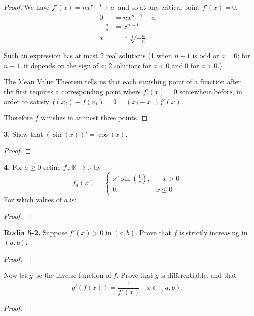 \documentclass{article}
\newcommand{\R}{\mathbb{R}}
\newcommand{\paren}[1]{\left( #1 \right)}
\newcommand{\problem}[1]{\noindent \textbf{#1}}
\begin{document}
\begin{proof}
    We have $f'(x) = nx^{n - 1} + a$, and so at any critical point $f'(x) = 0$, 
    \begin{align*}
        0 &= nx^{n - 1} + a \\
        -\frac{a}{n} &= x^{n - 1} \\
        x &= \sqrt[n - 1]{-\frac{a}{n}}
    \end{align*}

    Such an expression has at most $2$ real solutions (1 when $n - 1$ is odd or $a = 0$; for $n - 1$, it depends on the sign of $a$; 2 solutions for $a < 0$ and $0$ for $a > 0$.)

    The Mean Value Theorem tells us that each vanishing point of a function after the first requires a corresponding point where $f'(x) = 0$ somewhere before, in order to satisfy $f(x_2) - f(x_1) = 0 = (x_2 - x_1)f'(x)$.

    Therefore $f$ vanishes in at most three points.    
\end{proof}


\problem{3. }
Show that $(\sin(x))' = \cos(x)$.
\begin{proof}
    
\end{proof}


\problem{4. }
For $a \ge 0$ define $f_a : \R \to \R$ by
$$f_a(x) = \begin{cases}
    x^a \sin\paren{\frac{1}{x}}, & \quad x > 0 \\
    0, & x \le 0
\end{cases}$$
For which values of $a$ is:

\begin{proof}
    
\end{proof}


\problem{Rudin 5-2. }
Suppose $f'(x) > 0$ in $(a, b)$. Prove that $f$ is strictly increasing in $(a, b)$.
\begin{proof}
    
\end{proof}

Now let $g$ be the inverse function of $f$. Prove that $g$ is differentiable, and that
$$g'(f(x)) = \frac{1}{f'(x)} \quad x \in (a, b).$$
\begin{proof}
    
\end{proof}
\end{document}
